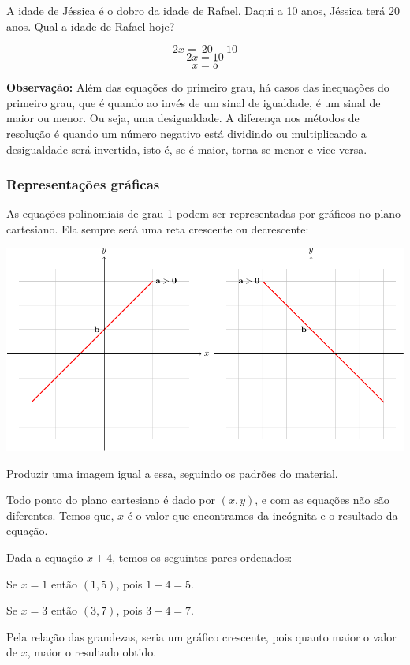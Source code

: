 {A idade de Jéssica é o dobro da idade de Rafael. Daqui a 10 anos,
Jéssica terá 20 anos. Qual a idade de Rafael hoje?

$$2x = \ 20 - 10$$
$$2x = 10$$
$$x = 5$$

\medskip \noindent \textbf{Observação:} Além das equações do primeiro grau, há casos das
inequações do primeiro grau, que é quando ao invés de um sinal de
igualdade, é um sinal de maior ou menor. Ou seja, uma desigualdade. A
diferença nos métodos de resolução é quando um número negativo está
dividindo ou multiplicando a desigualdade será invertida, isto é, se é
maior, torna-se menor e vice-versa.

\subsubsection{Representações gráficas}

As equações polinomiais de grau 1 podem ser representadas por gráficos
no plano cartesiano. Ela sempre será uma reta crescente ou decrescente:

\medskip\hfill\includegraphics[width=.7\textwidth]{./tikz/eixos-crop.pdf}\hfill\medskip

Produzir uma imagem igual a essa, seguindo os padrões do material.

Todo ponto do plano cartesiano é dado por $(x,y)$, e com as equações
não são diferentes. Temos que, $x$ é o valor que encontramos da incógnita
e o resultado da equação.



\medskip{}


Dada a equação $x + 4$, temos os seguintes pares ordenados: 

Se $x = 1$ então $(1,5)$, pois $1 + 4 = 5$.

Se $x = 3$ então $(3,7)$, pois $3 + 4 = 7$.

Pela relação das grandezas, seria um gráfico crescente, pois quanto
maior o valor de $x$, maior o resultado obtido.



}
